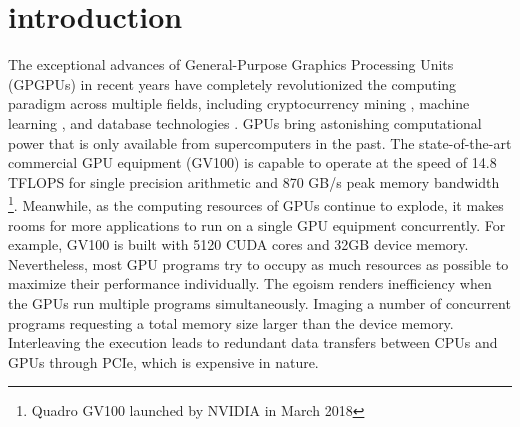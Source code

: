 \section{introduction}
The exceptional advances of General-Purpose Graphics Processing Units (GPGPUs) 
in recent years have completely revolutionized the computing paradigm across multiple fields, including cryptocurrency mining \cite{o2014bitcoin,taylor2013bitcoin}, machine learning \cite{coates2013deep,abadi2016tensorflow}, and database technologies \cite{bakkum2010accelerating,kaldewey2012gpu}.
GPUs bring astonishing computational power that is only available from supercomputers in the past. 
The state-of-the-art commercial GPU equipment (GV100) is capable to operate at the speed of 14.8 TFLOPS for single precision arithmetic and 870 GB/s peak memory bandwidth \footnote{Quadro GV100 launched by NVIDIA in March 2018}. 
Meanwhile, as the computing resources of GPUs continue to explode, it makes rooms for more applications to run on a single GPU equipment concurrently. For example, GV100 is built with 5120 CUDA cores and 32GB device memory. Nevertheless, most GPU programs try to occupy as much resources as possible to maximize their performance individually. 
The egoism renders inefficiency when the GPUs run multiple programs simultaneously. Imaging a number of concurrent programs requesting a total memory size larger than the device memory. Interleaving the execution leads to redundant data transfers between CPUs and GPUs through PCIe, which is expensive in nature. 

